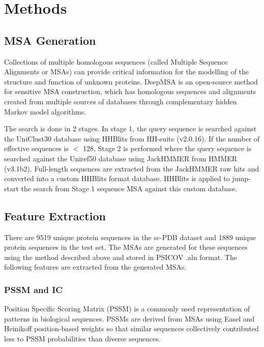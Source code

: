 \documentclass[journal=jacsat,manuscript=article]{achemso}
\begin{document}
\section{Methods}
\subsection{MSA Generation}
\quad Collections of multiple homologous sequences (called Multiple Sequence Alignments or MSAs) can provide critical information for the modelling of the structure and function of unknown proteins. DeepMSA \cite{zhang2020deepmsa} is an open-source method for sensitive MSA construction, which has homologous sequences and alignments created from multiple sources of databases through complementary hidden Markov model algorithms.

The search is done in 2 stages. In stage 1, the query sequence is searched against the UniClust30 \cite{mirdita2017uniclust} database using HHBlits from HH-suite\cite{remmert2012hhblits} (v2.0.16). If the number of effective sequences is $<$ 128, Stage 2 is performed where the query sequence is searched against the Uniref50 \cite{suzek2015uniref} database using JackHMMER from HMMER \cite{johnson2010hidden} (v3.1b2). Full-length sequences are extracted from the JackHMMER raw hits and converted into a custom HHBlits format database. HHBlits is applied to jump-start the search from Stage 1 sequence MSA against this custom database.


\subsection{Feature Extraction}
\quad There are 9519 unique protein sequences in the sc-PDB dataset and 1889 unique protein sequences in the test set. The MSAs are generated for these sequences using the method described above and stored in PSICOV \cite{jones2012psicov} .aln format. The following features are extracted from the generated MSAs.

\subsubsection{PSSM and IC}
\quad Position Specific Scoring Matrix (PSSM) is a commonly used representation of patterns in biological sequences. PSSMs are derived from MSAs using Easel \cite{potter2018hmmer} and Heinikoff position-based weights so that similar sequences collectively contributed less to PSSM probabilities than diverse sequences.
\end{document}
